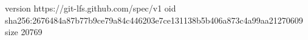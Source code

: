 version https://git-lfs.github.com/spec/v1
oid sha256:2676484a87b77b9ce79a84c446203e7ce131138b5b406a873c4a99aa21270609
size 20769
